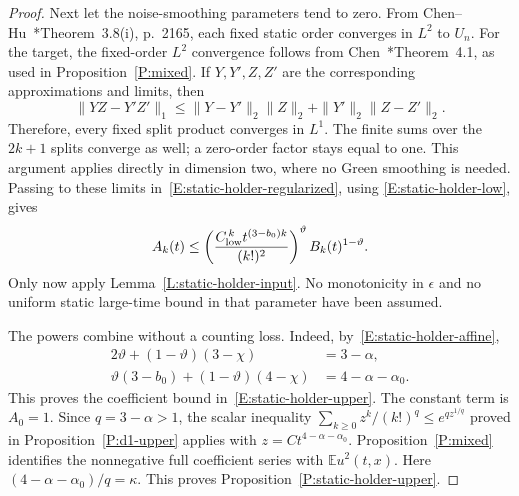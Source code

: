 \documentclass[12pt]{article}
\numberwithin{equation}{section}
\theoremstyle{definition}
\newcommand{\E}{\mathbb{E}}
\begin{document}
\begin{proof}
  Next let the noise-smoothing parameters tend to zero. From
  Chen--Hu~\cite{chen.hu:25:hyperbolic}*{Theorem~3.8(i), p.~2165},
  each fixed static order converges in $L^2$ to $U_n$.
  For the target, the fixed-order $L^2$ convergence follows from
  Chen~\cite{chen:author2026:time-dependency}*{Theorem~4.1}, as used in
  Proposition~\ref{P:mixed}. If $Y,Y',Z,Z'$ are the corresponding
  approximations and limits, then
  \[
    \|YZ-Y'Z'\|_1
    \le\|Y-Y'\|_2\|Z\|_2+\|Y'\|_2\|Z-Z'\|_2.
  \]
  Therefore, every fixed split product converges in $L^1$. The finite
  sums over the $2k+1$ splits converge as well; a zero-order factor
  stays equal to one. This argument applies directly in dimension two,
  where no Green smoothing is needed. Passing to these limits
  in~\eqref{E:static-holder-regularized}, using
  \eqref{E:static-holder-low}, gives
  \[
    A_k(t)\le
    \left(\frac{C_{\rm low}^{\,k}t^{(3-b_0)k}}{(k!)^2}\right)^\vartheta
    B_k(t)^{1-\vartheta}.
  \]
  Only now apply Lemma~\ref{L:static-holder-input}. No monotonicity
  in $\epsilon$ and no uniform static large-time bound in that
  parameter have been assumed.

  The powers combine without a counting loss. Indeed,
  by~\eqref{E:static-holder-affine},
  \[
    \begin{split}
      2\vartheta+(1-\vartheta)(3-\chi)&=3-\alpha,\\
      \vartheta(3-b_0)+(1-\vartheta)(4-\chi)
      &=4-\alpha-\alpha_0.
    \end{split}
  \]
  This proves the coefficient bound in~\eqref{E:static-holder-upper}.
  The constant term is $A_0=1$. Since $q=3-\alpha>1$, the scalar
  inequality $\sum_{k\ge0}z^k/(k!)^q\le e^{qz^{1/q}}$ proved in
  Proposition~\ref{P:d1-upper} applies with
  $z=Ct^{4-\alpha-\alpha_0}$. Proposition~\ref{P:mixed} identifies
  the nonnegative full coefficient series with $\E u^2(t,x)$.
  Here $(4-\alpha-\alpha_0)/q=\kappa$. This proves
  Proposition~\ref{P:static-holder-upper}.
\end{proof}
\end{document}
